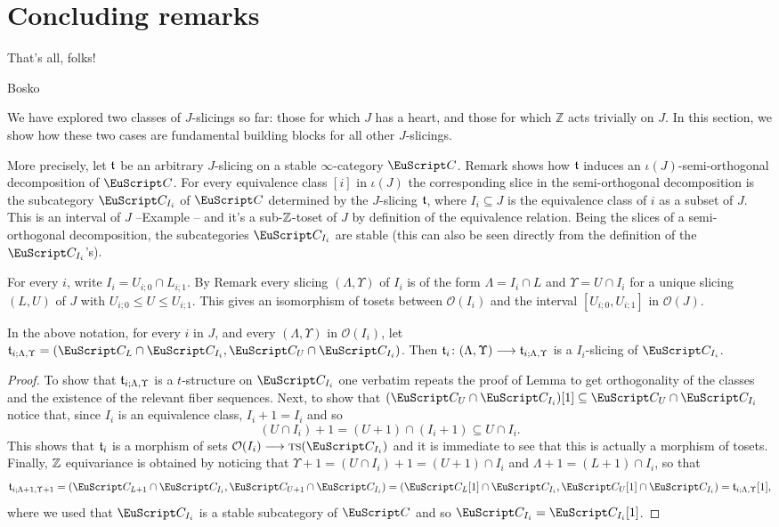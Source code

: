 \section{Concluding remarks}
\label{concluding}
\begin{modifyepigraph}{.2}
\epigraph{That's all, folks!}{Bosko}
\end{modifyepigraph}

We have explored two classes of $J$-slicings so far: those for which $J$ has a heart, and those for which $\mathbb{Z}$ acts trivially on $J$. In this section, we show how these two cases are fundamental building blocks for all other $J$-slicings. 

More precisely, let $\mathfrak{t}$ be an arbitrary $J$-slicing on a stable $\infty$-category $\C$. Remark  shows how $\mathfrak{t}$ induces an $\iota(J)$-semi-orthogonal decomposition of $\C$. For every equivalence class $[i]$ in $\iota(J)$ the corresponding slice in the semi-orthogonal decomposition is the subcategory $\C_{I_i}$ of $\C$ determined by the $J$-slicing $\mathfrak{t}$, where $I_i\subseteq J$ is the equivalence class of $i$ as a subset of $J$. This is an interval of $J$ --Example -- and it's a sub-$\mathbb{Z}$-toset of $J$ by definition of the equivalence relation. Being the slices of a semi-orthogonal decomposition, the subcategories $\C_{I_i}$ are stable (this can also be seen directly from the definition of the $\C_{I_i}$'s).

For every $i$, write $I_i=U_{i;0}\cap L_{i;1}$. By Remark  every slicing $(\Lambda,\Upsilon)$ of $I_i$ is of the form $\Lambda=I_{i}\cap L$ and $\Upsilon=U\cap I_{i}$ for a unique slicing $(L,U)$ of $J$ with $U_{i;0}\leq U\leq U_{i;1}$. This gives an isomorphism of tosets between $\mathcal{O}(I_i)$ and the interval $[U_{i;0},U_{i;1}]$ in $\mathcal{O}(J)$.
\begin{lemma}
In the above notation, for every $i$ in $J$, and every $(\Lambda,\Upsilon)$ in $\mathcal{O}(I_i)$, let $\tee_{i;\Lambda,\Upsilon}=(\C_L\cap \C_{I_i},\C_U\cap \C_{I_i})$. Then $\mathfrak{t}_i\colon (\Lambda,\Upsilon)\longrightarrow \mathfrak{t}_{i;\Lambda,\Upsilon}$ is a $I_i$-slicing of $\C_{I_i}$.
\end{lemma}
\begin{proof}To show that $\mathfrak{t}_{i;\Lambda,\Upsilon}$ is a $t$-structure on $\C_{I_i}$ one verbatim repeats the proof of Lemma  to get orthogonality of the classes and the existence of the relevant fiber sequences. Next, to show that $(\C_U\cap \C_{I_i})[1]\subseteq \C_U\cap \C_{I_i}$ notice that, since $I_i$ is an equivalence class, $I_i+1=I_i$ and so 
\[
(U\cap I_{i})+1=(U+1)\cap (I_i+1)\subseteq U\cap I_i.
\]
This shows that $\mathfrak{t}_i$ is a morphism of sets $\mathcal{O}(I_i)\to \ts(\C_{I_i})$ and it is immediate to see that this is actually a morphism of tosets. Finally, $\mathbb{Z}$ equivariance is obtained by noticing that $\Upsilon+1=(U\cap I_i)+1=(U+1)\cap I_i$ and $\Lambda+1=(L+1)\cap I_i$, so that
\[
\tee_{i;\Lambda+1,\Upsilon+1}=(\C_{L+1}\cap \C_{I_i},\C_{U+1}\cap \C_{I_i})=(\C_L[1]\cap \C_{I_i},\C_U[1]\cap \C_{I_i})=\tee_{i;\Lambda,\Upsilon}[1],
\]
where we used that $\C_{I_i}$ is a stable subcategory of $\C$ and so $\C_{I_i}=\C_{I_i}[1]$.
\end{proof}

